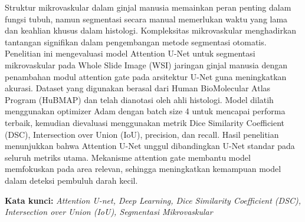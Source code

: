 \begin{abstractind}
\justifying

\noindent Struktur mikrovaskular dalam ginjal manusia memainkan peran penting dalam fungsi tubuh, namun segmentasi secara manual memerlukan waktu yang lama dan keahlian khusus dalam histologi. Kompleksitas mikrovaskular menghadirkan tantangan signifikan dalam pengembangan metode segmentasi otomatis. Penelitian ini mengevaluasi model Attention U-Net untuk segmentasi mikrovaskular pada Whole Slide Image (WSI) jaringan ginjal manusia dengan penambahan modul attention gate pada arsitektur U-Net guna meningkatkan akurasi. Dataset yang digunakan berasal dari Human BioMolecular Atlas Program (HuBMAP) dan telah dianotasi oleh ahli histologi. Model dilatih menggunakan optimizer Adam dengan batch size 4 untuk mencapai performa terbaik, kemudian dievaluasi menggunakan metrik Dice Similarity Coefficient (DSC), Intersection over Union (IoU), precision, dan recall. Hasil penelitian menunjukkan bahwa Attention U-Net unggul dibandingkan U-Net standar pada seluruh metriks utama. Mekanisme attention gate membantu model memfokuskan pada area relevan, sehingga meningkatkan kemampuan model dalam deteksi pembuluh darah kecil.

\bigskip
\noindent
\textbf{Kata kunci:} \textit{Attention U-net, Deep Learning, Dice Similarity Coefficient (DSC), Intersection over Union (IoU), Segmentasi Mikrovaskular}  %
\end{abstractind}

